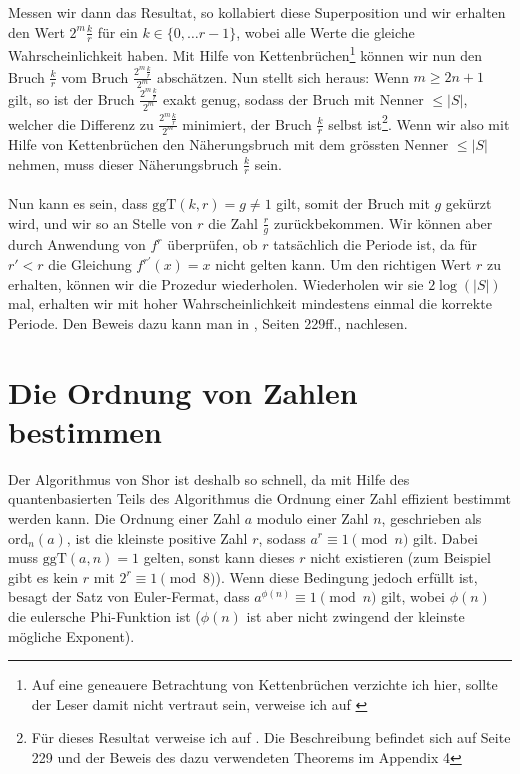 Messen wir dann das Resultat, so kollabiert diese Superposition und wir erhalten den Wert $2^m\frac{k}{r}$ für ein $k \in \{0, \dots r - 1\}$, wobei alle Werte die gleiche Wahrscheinlichkeit haben. Mit Hilfe von Kettenbrüchen\footnote{Auf eine geneauere Betrachtung von Kettenbrüchen verzichte ich hier, sollte der Leser damit nicht vertraut sein, verweise ich auf \cite{Frac}} können wir nun den Bruch $\frac{k}{r}$ vom Bruch $\frac{2^m\frac{k}{r}}{2^m}$ abschätzen. Nun stellt sich heraus: Wenn $m \geq 2n + 1$ gilt, so ist der Bruch $\frac{2^m\frac{k}{r}}{2^m}$ exakt genug, sodass der Bruch mit Nenner $\leq |S|$, welcher die Differenz zu $\frac{2^m\frac{k}{r}}{2^m}$ minimiert, der Bruch $\frac{k}{r}$ selbst ist\footnote{Für dieses Resultat verweise ich auf \cite{QC}. Die Beschreibung befindet sich auf Seite 229 und der Beweis des dazu verwendeten Theorems im Appendix 4}. Wenn wir also mit Hilfe von Kettenbrüchen den Näherungsbruch mit dem grössten Nenner $\leq |S|$ nehmen, muss dieser Näherungsbruch $\frac{k}{r}$ sein.
\paragraph{}
Nun kann es sein, dass $\text{ggT}(k, r) = g \neq 1$ gilt, somit der Bruch mit $g$ gekürzt wird, und wir so an Stelle von $r$ die Zahl $\frac{r}{g}$ zurückbekommen. Wir können aber durch Anwendung von $f^r$ überprüfen, ob $r$ tatsächlich die Periode ist, da für $r' < r$ die Gleichung $f^{r'}(x) = x$ nicht gelten kann. Um den richtigen Wert $r$ zu erhalten, können wir die Prozedur wiederholen. Wiederholen wir sie $2\log(|S|)$ mal, erhalten wir mit hoher Wahrscheinlichkeit mindestens einmal die korrekte Periode. Den Beweis dazu kann man in \cite{QC}, Seiten 229ff., nachlesen.

\section{Die Ordnung von Zahlen bestimmen}
Der Algorithmus von Shor ist deshalb so schnell, da mit Hilfe des quantenbasierten Teils des Algorithmus die Ordnung einer Zahl effizient bestimmt werden kann. Die Ordnung einer Zahl $a$ modulo einer Zahl $n$, geschrieben als $\text{ord}_n(a)$, ist die kleinste positive Zahl $r$, sodass $a^r \equiv 1 \pmod{n}$ gilt. Dabei muss $\text{ggT}(a, n) = 1$ gelten, sonst kann dieses $r$ nicht existieren (zum Beispiel gibt es kein $r$ mit $2^r \equiv 1 \pmod{8}$). Wenn diese Bedingung jedoch erfüllt ist, besagt der Satz von Euler-Fermat, dass $a^{\phi(n)} \equiv 1 \pmod{n}$ gilt, wobei $\phi(n)$ die eulersche Phi-Funktion ist ($\phi(n)$ ist aber nicht zwingend der kleinste mögliche Exponent). 

